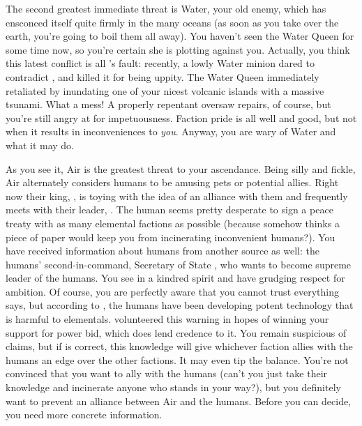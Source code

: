 \documentclass[char]{elementals}
\begin{document}
The second greatest immediate threat is Water, your old enemy, which has ensconced itself quite firmly in the many oceans (as soon as you take over the earth, you're going to boil them all away).  You haven't seen the Water Queen for some time now, so you're certain she is plotting against you.  Actually, you think this latest conflict is all \cPyro{}'s fault: recently, a lowly Water minion dared to contradict \cPyro{\them}, and \cPyro{} killed it for being uppity.  The Water Queen immediately retaliated by inundating one of your nicest volcanic islands with a massive tsunami.  What a mess!  A properly repentant \cPyro{} oversaw repairs, of course, but you're still angry at \cPyro{\them} for \cPyro{\their} impetuousness.  Faction pride is all well and good, but not when it results in inconveniences to \emph{you}.  Anyway, you are wary of Water and what it may do.

As you see it, Air is the greatest threat to your ascendance.  Being silly and fickle, Air alternately considers humans to be amusing pets or potential allies.  Right now their king, \cKing{\intro}, is toying with the idea of an alliance with them and frequently meets with their leader, \cLeader{\intro}.  The human seems pretty desperate to sign a peace treaty with as many elemental factions as possible (because somehow \cLeader{\they} thinks a piece of paper would keep you from incinerating inconvenient humans?).  You have received information about humans from another source as well: the humans' second-in-command, Secretary of State \cDema{\intro}, who wants to become supreme leader of the humans.  You see in \cDema{\them} a kindred spirit and have grudging respect for \cDema{\their} ambition.  Of course, you are perfectly aware that you cannot trust everything \cDema{\they} says, but according to \cDema{\them}, the humans have been developing potent technology that is harmful to elementals.  \cDema{\They} volunteered this warning in hopes of winning your support for \cDema{\their} power bid, which does lend credence to it.  You remain suspicious of \cDema{\their} claims, but if \cDema{\they} is correct, this knowledge will give whichever faction allies with the humans an edge over the other factions.  It may even tip the balance.  You're not convinced that you want to ally with the humans (can't you just take their knowledge and incinerate anyone who stands in your way?), but you definitely want to prevent an alliance between Air and the humans.  Before you can decide, you need more concrete information.
\end{document}
